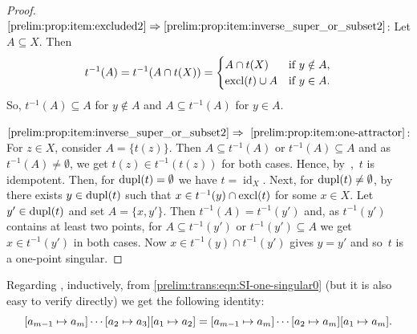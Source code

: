\begin{proof}
$\ref{prelim:prop:item:excluded2} \Rightarrow \ref{prelim:prop:item:inverse_super_or_subset2}$: Let $A \subseteq X$.
Then
\[
t^{-1}(A) = t^{-1}(A \cap t(X))
= \begin{cases}
	A \cap t(X) & \text{if } y \notin A, \\
	\excl{t} \cup A & \text{if } y \in A. 	
\end{cases}
\]
So, $t^{-1}(A) \subseteq A$ for $y \notin A$
and $A \subseteq t^{-1}(A)$ for $y \in A$.
	
$\ref{prelim:prop:item:inverse_super_or_subset2} \Rightarrow~\ref{prelim:prop:item:one-attractor}$: 
 For $z \in X$, consider $A = \{t(z)\}$. Then $A \subseteq t^{-1}(A)$ or $t^{-1}(A) \subseteq A$ and as $t^{-1}(A) \ne \emptyset$,
 we get $t(z) \in t^{-1}(t(z))$ for both cases.
 Hence, by~,~$t$ is idempotent. Then, for $\dupl{t} = \emptyset$ we have $t = \operatorname{id}_X$.
 Next, for $\dupl{t} \ne \emptyset$,
 by 
 there exists $y \in \dupl{t}$
 such that  $x \in t^{-1}(y) \cap \excl{t}$
 for some $x \in X$.
 Let $y' \in \dupl{t}$ and set $A = \{x,y'\}$.
 Then $t^{-1}(A) = t^{-1}(y')$ and, as $t^{-1}(y')$ contains at least two points,
 for $A \subseteq t^{-1}(y')$ or $t^{-1}(y') \subseteq A$
 we get $x \in t^{-1}(y')$ in both cases.
 Now $x \in t^{-1}(y) \cap t^{-1}(y')$ gives $y = y'$
 and so~$t$ is a one-point singular.
%
\end{proof}

Regarding ,
inductively, from \cref{prelim:trans:eqn:SI-one-singular0} (but it is also easy to verify directly)
we get the following identity:
\begin{equation} \label{prelim:eqn:concat-SI}
\concat{\SI{a_1}{a_2}}{\concat{\cdots \SI{a_2}{a_3}}{\SI{a_{m-1}}{a_m}}}
= [a_{m-1}\mapsto a_m] \cdots [a_2 \mapsto a_m][a_1 \mapsto a_m]. 
\end{equation}

